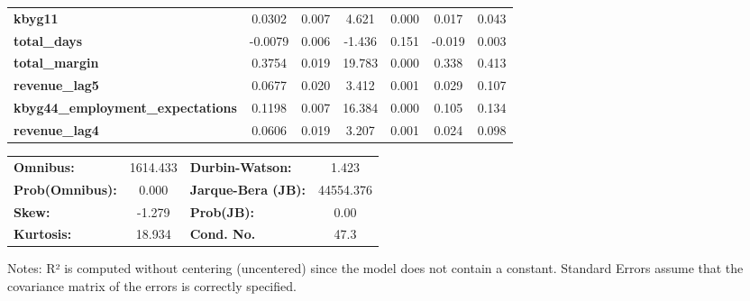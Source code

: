 \begin{center}
\begin{tabular}{lcccccc}
\textbf{kbyg11}                           &       0.0302  &        0.007     &     4.621  &         0.000        &        0.017    &        0.043     \\
\textbf{total\_days}                      &      -0.0079  &        0.006     &    -1.436  &         0.151        &       -0.019    &        0.003     \\
\textbf{total\_margin}                    &       0.3754  &        0.019     &    19.783  &         0.000        &        0.338    &        0.413     \\
\textbf{revenue\_lag5}                    &       0.0677  &        0.020     &     3.412  &         0.001        &        0.029    &        0.107     \\
\textbf{kbyg44\_employment\_expectations} &       0.1198  &        0.007     &    16.384  &         0.000        &        0.105    &        0.134     \\
\textbf{revenue\_lag4}                    &       0.0606  &        0.019     &     3.207  &         0.001        &        0.024    &        0.098     \\
\bottomrule
\end{tabular}
\begin{tabular}{lclc}
\textbf{Omnibus:}       & 1614.433 & \textbf{  Durbin-Watson:     } &     1.423  \\
\textbf{Prob(Omnibus):} &   0.000  & \textbf{  Jarque-Bera (JB):  } & 44554.376  \\
\textbf{Skew:}          &  -1.279  & \textbf{  Prob(JB):          } &      0.00  \\
\textbf{Kurtosis:}      &  18.934  & \textbf{  Cond. No.          } &      47.3  \\
\bottomrule
\end{tabular}
\end{center}

Notes: \newline
 [1] R² is computed without centering (uncentered) since the model does not contain a constant. \newline
 [2] Standard Errors assume that the covariance matrix of the errors is correctly specified.